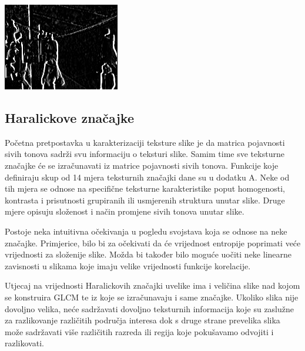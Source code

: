 \documentclass[times, utf8, zavrsni]{fer}
\begin{document}
\begin{multicols}{2}
\begin{minipage}{\linewidth}
\centering
\includegraphics[width=0.8\linewidth]{img/sobelx.jpg}
\end{minipage}

\end{multicols}

\newpage

\subsection{Haralickove značajke}

Početna pretpostavka u karakterizaciji teksture slike je da 
matrica pojavnosti sivih tonova sadrži svu  informaciju o teksturi slike. 
Samim time sve teksturne značajke će se izračunavati iz matrice pojavnosti sivih 
tonova. Funkcije koje definiraju skup od 14 mjera teksturnih značajki dane su u dodatku A. 
Neke od tih mjera se odnose na specifične teksturne karakteristike poput homogenosti, 
kontrasta i prisutnosti grupiranih ili usmjerenih struktura unutar slike. Druge mjere 
opisuju složenost i način promjene sivih tonova unutar slike.

\bigbreak

Postoje neka intuitivna očekivanja u pogledu svojstava koja se odnose na neke značajke.
Primjerice, bilo bi za očekivati da će vrijednost entropije poprimati veće vrijednosti za složenije slike. 
Možda bi također bilo moguće uočiti neke linearne zavisnosti u slikama koje imaju velike 
vrijednosti funkcije korelacije.

\bigbreak

Utjecaj na vrijednosti Haralickovih značajki uvelike ima i veličina slike nad kojom se konstruira
GLCM te iz koje se izračunavaju i same značajke. Ukoliko slika nije dovoljno velika, neće sadržavati
dovoljno teksturnih informacija koje su zaslužne za razlikovanje različitih područja interesa dok s druge
strane prevelika slika može sadržavati više različitih razreda ili regija koje pokušavamo odvojiti i razlikovati.
\end{document}
